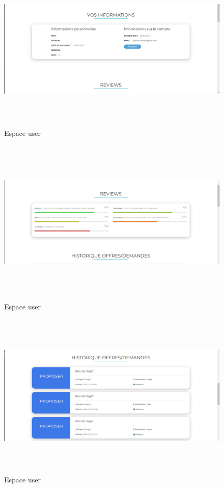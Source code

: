 \documentclass[a4paper]{report}
\begin{document}
\begin{spacing}{2}
\begin{figure}[!ht]
\begin{center}
\includegraphics[height=8cm]{user2.png}
\end{center}
\caption[Espace user]{Espace user}
\end{figure}

\begin{figure}[!ht]
\begin{center}
\includegraphics[height=8cm]{user3.png}
\end{center}
\caption[Espace user]{Espace user}
\end{figure}

\begin{figure}[!ht]
\begin{center}
\includegraphics[height=8cm]{user4.png}
\end{center}
\caption[Espace user]{Espace user}
\end{figure}
\cleardoublepage


\end{spacing}
\end{document}
